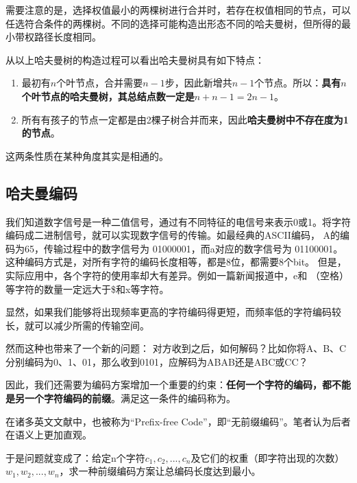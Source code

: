 需要注意的是，选择权值最小的两棵树进行合并时，若存在权值相同的节点，可以任选符合条件的两棵树。不同的选择可能构造出形态不同的哈夫曼树，但所得的最小带权路径长度相同。

\label{minisec:哈夫曼树的性质}
从以上哈夫曼树的构造过程可以看出哈夫曼树具有如下特点：
\begin{enumerate}
    \item 最初有$n$个叶节点，合并需要$n-1$步，因此新增共$n-1$个节点。所以：\textbf{具有$n$个叶节点的哈夫曼树，其总结点数一定是$n+n-1=2n-1$}。
    \item 所有有孩子的节点一定都是由2棵子树合并而来，因此\textbf{哈夫曼树中不存在度为1的节点}。
\end{enumerate}
这两条性质在某种角度其实是相通的。

\subsection{哈夫曼编码}
我们知道数字信号是一种二值信号，通过有不同特征的电信号来表示0或1。将字符编码成二进制信号，就可以实现数字信号的传输。如最经典的ASCII编码，
\textquotesingle A\textquotesingle 的编码为65，传输过程中的数字信号为 01000001，而\textquotesingle a\textquotesingle 对应的数字信号为 01100001。
这种编码方式是，对所有字符的编码长度相等，都是8位，都需要8个bit。
但是，实际应用中，各个字符的使用率却大有差异。例如一篇新闻报道中，\textquotesingle e\textquotesingle 和\textquotesingle \; \textquotesingle（空格）
等字符的数量一定远大于\textquotesingle \$\textquotesingle 和\textquotesingle x\textquotesingle 等字符。

显然，如果我们能够将出现频率更高的字符编码得更短，而频率低的字符编码较长，就可以减少所需的传输空间。

然而这种也带来了一个新的问题：
对方收到之后，如何解码？比如你将A、B、C分别编码为0、1、01，那么收到0101，应解码为ABAB还是ABC或CC？

因此，我们还需要为编码方案增加一个重要的约束：\textbf{任何一个字符的编码，都不能是另一个字符编码的前缀}。满足这一条件的编码称为。

\begin{insightbox}
    在诸多英文文献中，也被称为“Prefix-free Code”，即“无前缀编码”。笔者认为后者在语义上更加直观。
\end{insightbox}

于是问题就变成了：给定n个字符$c_1, c_2, ..., c_n$及它们的权重（即字符出现的次数）$w_1, w_2, ..., w_n$，求一种前缀编码方案让总编码长度达到最小。

